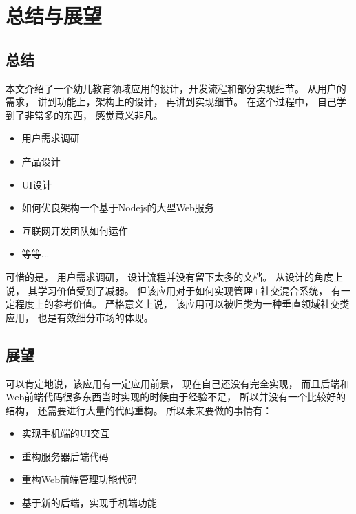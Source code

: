 \chapter{总结与展望}

\section{总结}


本文介绍了一个幼儿教育领域应用的设计，开发流程和部分实现细节。 从用户的需求， 讲到功能上，架构上的设计， 再讲到实现细节。  在这个过程中， 自己学到了非常多的东西， 感觉意义非凡。



\begin{itemize}
\item 用户需求调研
\item 产品设计
\item UI设计
\item 如何优良架构一个基于Nodejs的大型Web服务
\item 互联网开发团队如何运作
\item 等等...
\end{itemize}


可惜的是， 用户需求调研， 设计流程并没有留下太多的文档。 从设计的角度上说， 其学习价值受到了减弱。 但该应用对于如何实现管理+社交混合系统， 有一定程度上的参考价值。 严格意义上说， 该应用可以被归类为一种垂直领域社交类应用， 也是有效细分市场的体现。


\section{展望}


可以肯定地说，该应用有一定应用前景， 现在自己还没有完全实现， 而且后端和Web前端代码很多东西当时实现的时候由于经验不足， 所以并没有一个比较好的结构， 还需要进行大量的代码重构。 所以未来要做的事情有：

\begin{itemize}
\item  实现手机端的UI交互
\item  重构服务器后端代码
\item  重构Web前端管理功能代码
\item  基于新的后端，实现手机端功能
\end{itemize}
